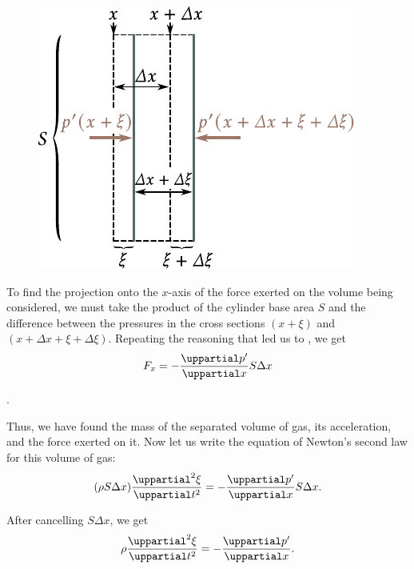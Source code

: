 \begin{figure}[t]
	\begin{center}
		\includegraphics[scale=1]{figures/ch_14/fig_14_14.pdf}
		\caption[]{}
		\label{fig:14_14}
	\end{center}
	\vspace{-0.8cm}
\end{figure}

To find the projection onto the $x$-axis of the force exerted on the volume being considered, we must take the product of the cylinder base area $S$ and the difference between the pressures in the cross sections $(x+\xi)$ and $(x + \Delta{x} + \xi + \Delta{\xi})$.
Repeating the reasoning that led us to , we get
\begin{equation*}
	F_x = - \diffpartial{p'}{x} S \Delta{x}
\end{equation*}

.

Thus, we have found the mass of the separated volume of gas, its acceleration, and the force exerted on it.
Now let us write the equation of Newton's second law for this volume of gas:
\begin{equation*}
	(\rho S \Delta{x}) \diffnpartial{\xi}{t}{2} = - \diffpartial{p'}{x} S \Delta{x}.
\end{equation*}

\noindent
After cancelling $S\Delta{x}$, we get
\begin{equation}\label{eq:14_65}
	\rho \diffnpartial{\xi}{t}{2} = - \diffpartial{p'}{x}.
\end{equation}

